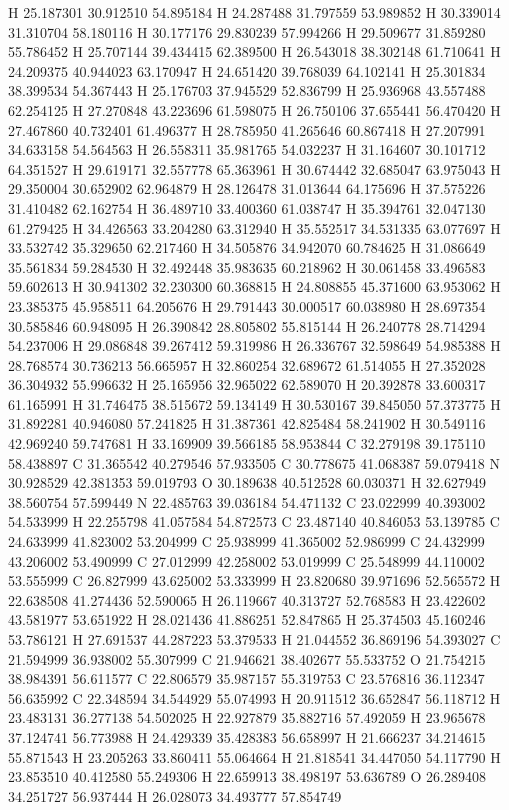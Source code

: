 \documentclass{article}
\begin{document}
H 25.187301 30.912510 54.895184 
H 24.287488 31.797559 53.989852 
H 30.339014 31.310704 58.180116 
H 30.177176 29.830239 57.994266 
H 29.509677 31.859280 55.786452 
H 25.707144 39.434415 62.389500 
H 26.543018 38.302148 61.710641 
H 24.209375 40.944023 63.170947 
H 24.651420 39.768039 64.102141 
H 25.301834 38.399534 54.367443 
H 25.176703 37.945529 52.836799 
H 25.936968 43.557488 62.254125 
H 27.270848 43.223696 61.598075 
H 26.750106 37.655441 56.470420 
H 27.467860 40.732401 61.496377 
H 28.785950 41.265646 60.867418 
H 27.207991 34.633158 54.564563 
H 26.558311 35.981765 54.032237 
H 31.164607 30.101712 64.351527 
H 29.619171 32.557778 65.363961 
H 30.674442 32.685047 63.975043 
H 29.350004 30.652902 62.964879 
H 28.126478 31.013644 64.175696 
H 37.575226 31.410482 62.162754 
H 36.489710 33.400360 61.038747 
H 35.394761 32.047130 61.279425 
H 34.426563 33.204280 63.312940 
H 35.552517 34.531335 63.077697 
H 33.532742 35.329650 62.217460 
H 34.505876 34.942070 60.784625 
H 31.086649 35.561834 59.284530 
H 32.492448 35.983635 60.218962 
H 30.061458 33.496583 59.602613 
H 30.941302 32.230300 60.368815 
H 24.808855 45.371600 63.953062 
H 23.385375 45.958511 64.205676 
H 29.791443 30.000517 60.038980 
H 28.697354 30.585846 60.948095 
H 26.390842 28.805802 55.815144 
H 26.240778 28.714294 54.237006 
H 29.086848 39.267412 59.319986 
H 26.336767 32.598649 54.985388 
H 28.768574 30.736213 56.665957 
H 32.860254 32.689672 61.514055 
H 27.352028 36.304932 55.996632 
H 25.165956 32.965022 62.589070 
H 20.392878 33.600317 61.165991 
H 31.746475 38.515672 59.134149 
H 30.530167 39.845050 57.373775 
H 31.892281 40.946080 57.241825 
H 31.387361 42.825484 58.241902 
H 30.549116 42.969240 59.747681 
H 33.169909 39.566185 58.953844 
C 32.279198 39.175110 58.438897 
C 31.365542 40.279546 57.933505 
C 30.778675 41.068387 59.079418 
N 30.928529 42.381353 59.019793 
O 30.189638 40.512528 60.030371 
H 32.627949 38.560754 57.599449 
N 22.485763 39.036184 54.471132 
C 23.022999 40.393002 54.533999 
H 22.255798 41.057584 54.872573 
C 23.487140 40.846053 53.139785 
C 24.633999 41.823002 53.204999 
C 25.938999 41.365002 52.986999 
C 24.432999 43.206002 53.490999 
C 27.012999 42.258002 53.019999 
C 25.548999 44.110002 53.555999 
C 26.827999 43.625002 53.333999 
H 23.820680 39.971696 52.565572 
H 22.638508 41.274436 52.590065 
H 26.119667 40.313727 52.768583 
H 23.422602 43.581977 53.651922 
H 28.021436 41.886251 52.847865 
H 25.374503 45.160246 53.786121 
H 27.691537 44.287223 53.379533 
H 21.044552 36.869196 54.393027 
C 21.594999 36.938002 55.307999 
C 21.946621 38.402677 55.533752 
O 21.754215 38.984391 56.611577 
C 22.806579 35.987157 55.319753 
C 23.576816 36.112347 56.635992 
C 22.348594 34.544929 55.074993 
H 20.911512 36.652847 56.118712 
H 23.483131 36.277138 54.502025 
H 22.927879 35.882716 57.492059 
H 23.965678 37.124741 56.773988 
H 24.429339 35.428383 56.658997 
H 21.666237 34.214615 55.871543 
H 23.205263 33.860411 55.064664 
H 21.818541 34.447050 54.117790 
H 23.853510 40.412580 55.249306 
H 22.659913 38.498197 53.636789 
O 26.289408 34.251727 56.937444 
H 26.028073 34.493777 57.854749 
~     
    
\end{document}
